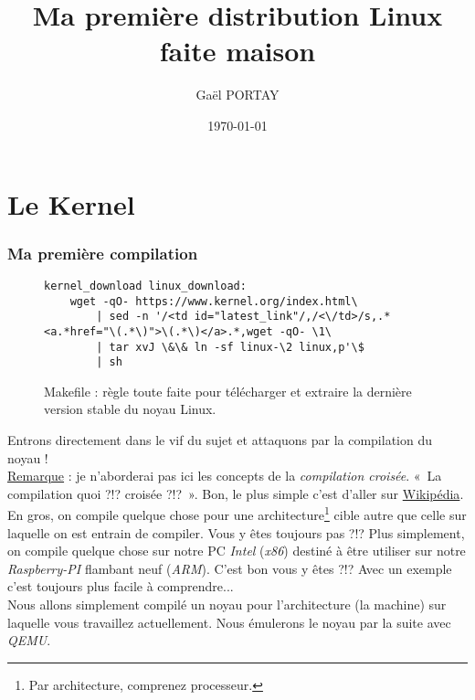 \documentclass[a4paper]{article}
\title{Ma première distribution Linux faite maison}
\author{Gaël PORTAY}
\date{\today}
\begin{document}
\sloppy
\maketitle

\begin{abstract}
\end{abstract}

\clearpage
\tableofcontents

\clearpage
\part{Le Kernel}

\section{Ma première compilation}

\begin{figure}
\label{makefile:linux_download}
\lstset{language=make,numbers=left,tabsize=2}
\begin{lstlisting}
kernel_download linux_download:
	wget -qO- https://www.kernel.org/index.html\
		| sed -n '/<td id="latest_link"/,/<\/td>/s,.*<a.*href="\(.*\)">\(.*\)</a>.*,wget -qO- \1\
		| tar xvJ \&\& ln -sf linux-\2 linux,p'\$
		| sh
\end{lstlisting}
\caption{Makefile : règle toute faite pour télécharger et extraire la dernière version stable du noyau Linux.}
\end{figure}

Entrons directement dans le vif du sujet et attaquons par la compilation du noyau !\\

\underline{Remarque} : je n'aborderai pas ici les concepts de la \textit{compilation croisée}. «~La compilation quoi ?!? croisée ?!?~». Bon, le plus simple c'est d'aller sur \href{https://fr.wikipedia.org/wiki/Compilateur#Compilation_crois.C3.A9e}{Wikipédia}. En gros, on compile quelque chose pour une architecture\footnote{Par architecture, comprenez processeur.}  cible autre que celle sur laquelle on est entrain de compiler. Vous y êtes toujours pas ?!? Plus simplement, on compile quelque chose sur notre PC \textit{Intel} (\textit{x86}) destiné à être utiliser sur notre \textit{Raspberry-PI} flambant neuf (\textit{ARM}). C'est bon vous y êtes ?!? Avec un exemple c'est toujours plus facile à comprendre...\\

Nous allons simplement compilé un noyau pour l'architecture (la machine) sur laquelle vous travaillez actuellement. Nous émulerons le noyau par la suite avec \textit{QEMU}.\\
\end{document}
